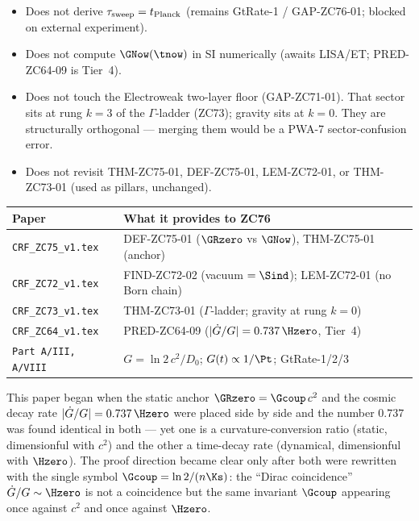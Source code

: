 \documentclass[12pt, a4paper]{article}
\begin{document}
\begin{keybox}[title={What ZC76 Does NOT Do}]
\begin{itemize}[leftmargin=2em, noitemsep]
  \item Does not derive $\tau_{\rm sweep} = t_{\rm Planck}$
    (remains GtRate-1 / GAP-ZC76-01; blocked on external experiment).
  \item Does not compute $\GNow(\tnow)$ in SI numerically
    (awaits LISA/ET; PRED-ZC64-09 is Tier~4).
  \item Does not touch the Electroweak two-layer floor (GAP-ZC71-01).
    That sector sits at rung $k=3$ of the $\Gamma$-ladder (ZC73);
    gravity sits at $k=0$. They are structurally orthogonal --- merging
    them would be a PWA-7 sector-confusion error.
  \item Does not revisit THM-ZC75-01, DEF-ZC75-01, LEM-ZC72-01,
    or THM-ZC73-01 (used as pillars, unchanged).
\end{itemize}
\end{keybox}

\begin{keybox}[title={Companion Papers --- ZC76}]
{\small\renewcommand{\arraystretch}{1.25}
\begin{center}
\begin{tabular}{@{}p{5.0cm}p{7.5cm}@{}}
\toprule
\textbf{Paper} & \textbf{What it provides to ZC76} \\
\midrule
\texttt{CRF\_ZC75\_v1.tex}
  & DEF-ZC75-01 ($\GRzero$ vs $\GNow$), THM-ZC75-01 (anchor) \\
\texttt{CRF\_ZC72\_v1.tex}
  & FIND-ZC72-02 (vacuum $= \Sind$); LEM-ZC72-01 (no Born chain) \\
\texttt{CRF\_ZC73\_v1.tex}
  & THM-ZC73-01 ($\Gamma$-ladder; gravity at rung $k=0$) \\
\texttt{CRF\_ZC64\_v1.tex}
  & PRED-ZC64-09 ($|\dot{G}/G| = 0.737\,\Hzero$, Tier~4) \\
\texttt{Part~A/III, A/VIII}
  & $G = \ln2\,c^2/D_0$; $G(t)\propto 1/\Pt$; GtRate-1/2/3 \\
\bottomrule
\end{tabular}
\end{center}}
\end{keybox}

\begin{derivedbox}[title={Discovery Note}]
This paper began when the static anchor $\GRzero = \Gcoup\,c^2$ and the
cosmic decay rate $|\dot{G}/G| = 0.737\,\Hzero$ were placed side by side
and the number $0.737$ was found identical in both --- yet one is a
curvature-conversion ratio (static, dimensionful with $c^2$) and the
other a time-decay rate (dynamical, dimensionful with $\Hzero$).
The proof direction became clear only after both were rewritten with the
single symbol $\Gcoup = \ln2/(n\Ks)$: the ``Dirac coincidence''
$\dot{G}/G \sim \Hzero$ is not a coincidence but the same invariant
$\Gcoup$ appearing once against $c^2$ and once against $\Hzero$.
\end{derivedbox}
\end{document}
